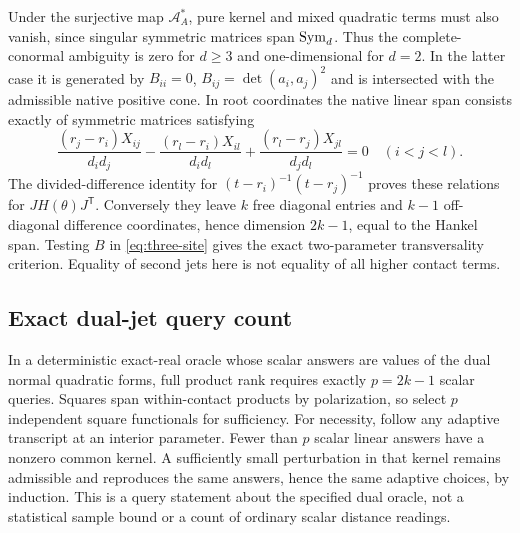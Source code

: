 Under the surjective map $\mathcal A_A^*$, pure kernel and mixed quadratic terms must also vanish, since singular symmetric matrices span $\operatorname{Sym}_d$. Thus the complete-conormal ambiguity is zero for $d\ge3$ and one-dimensional for $d=2$. In the latter case it is generated by $B_{ii}=0$, $B_{ij}=\det(a_i,a_j)^2$ and is intersected with the admissible native positive cone. In root coordinates the native linear span consists exactly of symmetric matrices satisfying
\begin{equation}\label{eq:three-site}
 \frac{(r_j-r_i)X_{ij}}{d_id_j}
 -\frac{(r_l-r_i)X_{il}}{d_id_l}
 +\frac{(r_l-r_j)X_{jl}}{d_jd_l}=0\quad(i<j<l).
\end{equation}
The divided-difference identity for $(t-r_i)^{-1}(t-r_j)^{-1}$ proves these relations for $JH(\theta)J^{\mathsf T}$. Conversely they leave $k$ free diagonal entries and $k-1$ off-diagonal difference coordinates, hence dimension $2k-1$, equal to the Hankel span. Testing $B$ in \eqref{eq:three-site} gives the exact two-parameter transversality criterion. Equality of second jets here is not equality of all higher contact terms.

\subsection{Exact dual-jet query count}
In a deterministic exact-real oracle whose scalar answers are values of the dual normal quadratic forms, full product rank requires exactly $p=2k-1$ scalar queries. Squares span within-contact products by polarization, so select $p$ independent square functionals for sufficiency. For necessity, follow any adaptive transcript at an interior parameter. Fewer than $p$ scalar linear answers have a nonzero common kernel. A sufficiently small perturbation in that kernel remains admissible and reproduces the same answers, hence the same adaptive choices, by induction. This is a query statement about the specified dual oracle, not a statistical sample bound or a count of ordinary scalar distance readings.

